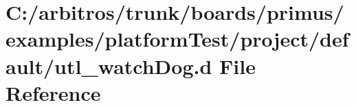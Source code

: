 \hypertarget{boards_2primus_2examples_2platform_test_2project_2default_2utl__watch_dog_8d}{\section{C\-:/arbitros/trunk/boards/primus/examples/platform\-Test/project/default/utl\-\_\-watch\-Dog.d File Reference}
\label{boards_2primus_2examples_2platform_test_2project_2default_2utl__watch_dog_8d}
}
